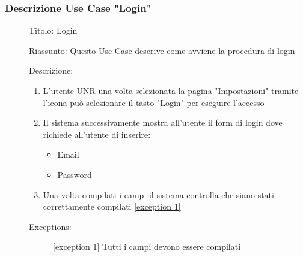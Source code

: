 \documentclass{article}
\begin{document}
\subsubsection*{Descrizione Use Case "Login"}
\begin{description}
    \item[] Titolo: Login
    \item[] Riassunto: Questo Use Case descrive come avviene la procedura di login
    \item[] Descrizione:
        \begin{enumerate}
            \item L'utente UNR una volta selezionata la pagina "Impostazioni" tramite l'icona  può selezionare il tasto "Login" per eseguire l'accesso
            \item Il sistema successivamente mostra all'utente il form di login dove richiede all'utente di inserire:
                  \begin{itemize}
                      \item Email
                      \item Password
                  \end{itemize}
            \item Una volta compilati i campi il sistema controlla che siano stati correttamente compilati \hyperref[exc:8.1]{[exception 1]}
        \end{enumerate}
    \item[] Exceptions:
        \begin{description}
            \item[] \label{exc:8.1} [exception 1] Tutti i campi devono essere compilati
        \end{description}
\end{description}
\clearpage
\end{document}
